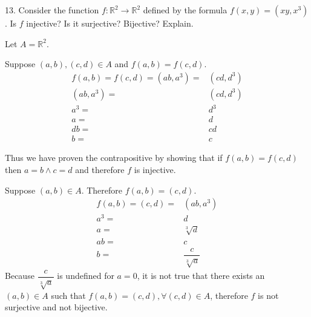 \documentclass{hippoidC}
\begin{document}
\begin{prooflist}{13. Consider the function $f: \mathbb{R}^2 \rightarrow
			\mathbb{R}^2$ defined by the formula $f(x, y)=\left(x y, x^3\right)$. Is $f$
		injective? Is it surjective? Bijective? Explain.}
	\inj{}
	\item Let $A=\mathbb{R}^2$.
	\item Suppose $(a, b), (c, d) \in A$ and $f(a, b)=f(c, d)$.
	\begin{align*}
		f(a, b)=f(c, d)=(ab, a^3) = & (cd, d^3) \\
		(ab, a^3) =                 & (cd, d^3) \\
		a^3=                        & d^3       \\
		a=                          & d         \\
		db=                         & cd        \\
		b=                          & c
	\end{align*}
	\item Thus we have proven the contrapositive by showing that if $f(a, b)=f(c,
		d)$ then $a=b \land c=d$ and therefore $f$ is injective.
	\surj{}
	\item Suppose $(a, b)\in A$. Therefore $f(a, b)=(c, d)$.
	\begin{align*}
		f(a, b)=(c,d)= & (ab, a^3)              \\
		a^3=           & d                      \\
		a=             & \sqrt[3]{d}            \\
		ab=            & c                      \\
		b=             & \dfrac{c}{\sqrt[3]{a}}
	\end{align*}
	Because $\dfrac{c}{\sqrt[3]{a}}$ is undefined for $a=0$, it is not true that
	there exists an $(a, b)\in A$ such that $f(a, b)=(c, d), \forall (c, d) \in A$,
	therefore $f$ is not surjective and not bijective.
\end{prooflist}
\end{document}
